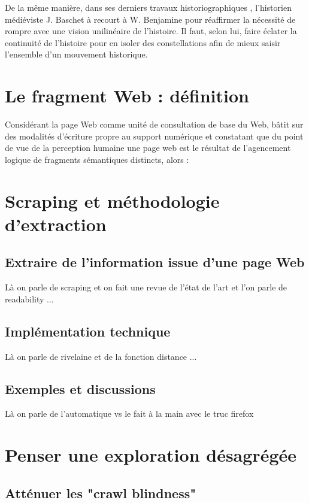 \documentclass{tufte-book}
\begin{document}
De la même manière, dans ses derniers travaux historiographiques \citep{baschet_defaire_2018}, l'historien médiéviste J. Baschet à recourt à W. Benjamine pour réaffirmer la nécessité de rompre avec une vision unilinéaire de l'histoire. Il faut, selon lui, faire éclater la continuité de l'histoire pour en isoler des constellations afin de mieux saisir l'ensemble d'un mouvement historique. 

\section{Le fragment Web : définition}

Considérant la page Web comme unité de consultation de base du Web, bâtit sur des modalités d'écriture propre au support numérique et constatant que du point de vue de la perception humaine une page web est le résultat de l'agencement logique de fragments sémantiques distincts, alors :

\section{Scraping et méthodologie d'extraction}

\subsection{Extraire de l'information issue d'une page Web}

Là on parle de scraping et on fait une revue de l'état de l'art et l'on parle de readability ...

\subsection{Implémentation technique}

Là on parle de rivelaine et de la fonction distance ...

\subsection{Exemples et discussions}

Là on parle de l'automatique vs le fait à la main avec le truc firefox

\section{Penser une exploration désagrégée}

\subsection{Atténuer les "crawl blindness"}
\end{document}
